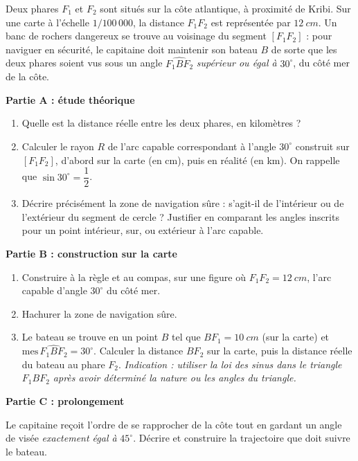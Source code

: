 \documentclass[11pt]{article}
\begin{document}
\begin{exercice}
Deux phares $F_1$ et $F_2$ sont situés sur la côte atlantique, à proximité de Kribi. Sur une carte à l'échelle $1/100\,000$, la distance $F_1F_2$ est représentée par $\SI{12}{cm}$. Un banc de rochers dangereux se trouve au voisinage du segment $[F_1F_2]$ : pour naviguer en sécurité, le capitaine doit maintenir son bateau $B$ de sorte que les deux phares soient vus sous un angle $\widehat{F_1BF_2}$ \emph{supérieur ou égal à} $30^{\circ}$, du côté mer de la côte.

\textbf{Partie A : étude théorique}
\begin{enumerate}
\item Quelle est la distance réelle entre les deux phares, en kilomètres ?
\item Calculer le rayon $R$ de l'arc capable correspondant à l'angle $30^{\circ}$ construit sur $[F_1F_2]$, d'abord sur la carte (en cm), puis en réalité (en km). On rappelle que $\sin 30^{\circ} = \dfrac{1}{2}$.
\item Décrire précisément la zone de navigation sûre : s'agit-il de l'intérieur ou de l'extérieur du segment de cercle ? Justifier en comparant les angles inscrits pour un point intérieur, sur, ou extérieur à l'arc capable.
\end{enumerate}

\textbf{Partie B : construction sur la carte}
\begin{enumerate}
\item Construire à la règle et au compas, sur une figure où $F_1F_2 = \SI{12}{cm}$, l'arc capable d'angle $30^{\circ}$ du côté mer.
\item Hachurer la zone de navigation sûre.
\item Le bateau se trouve en un point $B$ tel que $BF_1 = \SI{10}{cm}$ (sur la carte) et $\mathrm{mes}\,\widehat{F_1BF_2} = 30^{\circ}$. Calculer la distance $BF_2$ sur la carte, puis la distance réelle du bateau au phare $F_2$. \emph{Indication : utiliser la loi des sinus dans le triangle $F_1BF_2$ après avoir déterminé la nature ou les angles du triangle.}
\end{enumerate}

\textbf{Partie C : prolongement}

Le capitaine reçoit l'ordre de se rapprocher de la côte tout en gardant un angle de visée \emph{exactement égal à} $45^{\circ}$. Décrire et construire la trajectoire que doit suivre le bateau.
\end{exercice}
\end{document}

